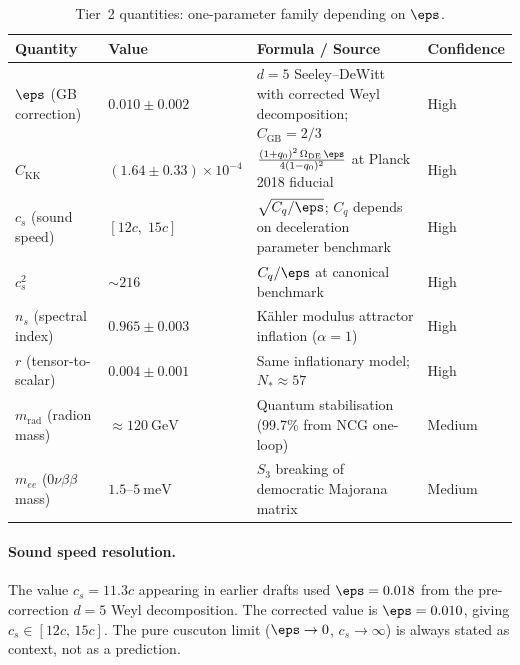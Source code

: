 \begin{table}[h!]
\caption{Tier~2 quantities: one-parameter family depending on $\eps$.}
\label{tab:val-tier2}
\small
\renewcommand{\arraystretch}{1.25}
\begin{tabular}{@{}p{3.0cm}p{3.0cm}p{5.5cm}p{2.5cm}@{}}
\toprule
\textbf{Quantity} & \textbf{Value} & \textbf{Formula / Source} & \textbf{Confidence} \\
\midrule

$\eps$ (GB correction) &
$0.010 \pm 0.002$ &
$d = 5$ Seeley--DeWitt with corrected Weyl decomposition; $C_\mathrm{GB} = 2/3$ &
High \\

$C_\mathrm{KK}$ &
$(1.64 \pm 0.33) \times 10^{-4}$ &
$\frac{(1 + q_0)^2\,\Omega_\mathrm{DE}\,\eps}{4(1 - q_0)^2}$ at Planck 2018 fiducial &
High \\

$c_s$ (sound speed) &
$[12c,\; 15c]$ &
$\sqrt{C_q/\eps}$; $C_q$ depends on deceleration parameter benchmark &
High \\

$c_s^2$ &
$\sim 216$ &
$C_q/\eps$ at canonical benchmark &
High \\

$n_s$ (spectral index) &
$0.965 \pm 0.003$ &
K\"ahler modulus attractor inflation ($\alpha = 1$) &
High \\

$r$ (tensor-to-scalar) &
$0.004 \pm 0.001$ &
Same inflationary model; $N_* \approx 57$ &
High \\

$m_\mathrm{rad}$ (radion mass) &
$\approx 120~\mathrm{GeV}$ &
Quantum stabilisation (99.7\% from NCG one-loop) &
Medium \\

$m_{ee}$ (0$\nu\beta\beta$ mass) &
$1.5$--$5~\mathrm{meV}$ &
$S_3$ breaking of democratic Majorana matrix &
Medium \\

\bottomrule
\end{tabular}
\end{table}

\paragraph{Sound speed resolution.}
The value $c_s = 11.3c$ appearing in earlier drafts used $\eps = 0.018$ from the pre-correction $d = 5$ Weyl decomposition. The corrected value is $\eps = 0.010$, giving $c_s \in [12c,\, 15c]$. The pure cuscuton limit ($\eps \to 0$, $c_s \to \infty$) is always stated as context, not as a prediction.

